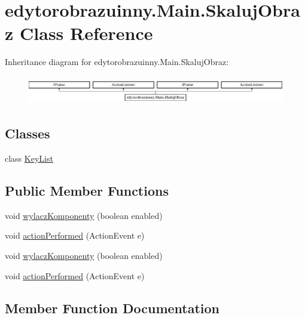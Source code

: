 \hypertarget{classedytorobrazuinny_1_1_main_1_1_skaluj_obraz}{}\section{edytorobrazuinny.\+Main.\+Skaluj\+Obraz Class Reference}
\label{classedytorobrazuinny_1_1_main_1_1_skaluj_obraz}
Inheritance diagram for edytorobrazuinny.\+Main.\+Skaluj\+Obraz\+:\begin{figure}[H]
\begin{center}
\leavevmode
\includegraphics[height=1.250000cm]{classedytorobrazuinny_1_1_main_1_1_skaluj_obraz}
\end{center}
\end{figure}
\subsection*{Classes}
\begin{DoxyCompactItemize}
\item 
class \hyperlink{classedytorobrazuinny_1_1_main_1_1_skaluj_obraz_1_1_key_list}{Key\+List}
\end{DoxyCompactItemize}
\subsection*{Public Member Functions}
\begin{DoxyCompactItemize}
\item 
void \hyperlink{classedytorobrazuinny_1_1_main_1_1_skaluj_obraz_ab796d938ac3680ee7b2aaf991cae3e95}{wylacz\+Komponenty} (boolean enabled)
\item 
void \hyperlink{classedytorobrazuinny_1_1_main_1_1_skaluj_obraz_a7422a35e2ee09b44bdd4ecaee0cf58f9}{action\+Performed} (Action\+Event e)
\item 
void \hyperlink{classedytorobrazuinny_1_1_main_1_1_skaluj_obraz_ab796d938ac3680ee7b2aaf991cae3e95}{wylacz\+Komponenty} (boolean enabled)
\item 
void \hyperlink{classedytorobrazuinny_1_1_main_1_1_skaluj_obraz_a7422a35e2ee09b44bdd4ecaee0cf58f9}{action\+Performed} (Action\+Event e)
\end{DoxyCompactItemize}


\subsection{Member Function Documentation}
\hypertarget{classedytorobrazuinny_1_1_main_1_1_skaluj_obraz_a7422a35e2ee09b44bdd4ecaee0cf58f9}{}
